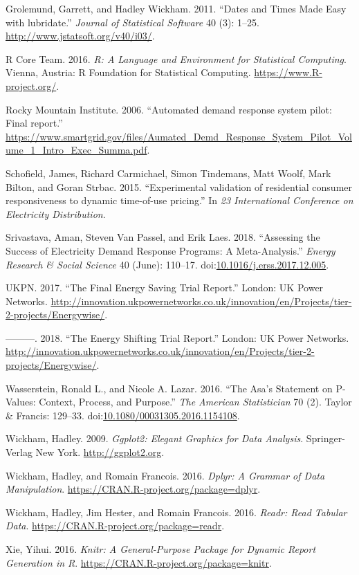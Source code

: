 \documentclass[]{article}
\theoremstyle{definition}
\theoremstyle{definition}
\theoremstyle{definition}
\theoremstyle{remark}
\begin{document}
\hypertarget{ref-lubridate}{}
Grolemund, Garrett, and Hadley Wickham. 2011. ``Dates and Times Made
Easy with lubridate.'' \emph{Journal of Statistical Software} 40 (3):
1--25. \url{http://www.jstatsoft.org/v40/i03/}.

\hypertarget{ref-baseR}{}
R Core Team. 2016. \emph{R: A Language and Environment for Statistical
Computing}. Vienna, Austria: R Foundation for Statistical Computing.
\url{https://www.R-project.org/}.

\hypertarget{ref-RockyMountainInstitute2006Automated}{}
Rocky Mountain Institute. 2006. ``Automated demand response system
pilot: Final report.''
\url{https://www.smartgrid.gov/files/Aumated_Demd_Response_System_Pilot_Volume_1_Intro_Exec_Summa.pdf}.

\hypertarget{ref-Schofield2015Experimental}{}
Schofield, James, Richard Carmichael, Simon Tindemans, Matt Woolf, Mark
Bilton, and Goran Strbac. 2015. ``Experimental validation of residential
consumer responsiveness to dynamic time-of-use pricing.'' In \emph{23
International Conference on Electricity Distribution}.

\hypertarget{ref-Srivastava2018Assessing}{}
Srivastava, Aman, Steven Van Passel, and Erik Laes. 2018. ``Assessing
the Success of Electricity Demand Response Programs: A Meta-Analysis.''
\emph{Energy Research \& Social Science} 40 (June): 110--17.
doi:\href{https://doi.org/10.1016/j.erss.2017.12.005}{10.1016/j.erss.2017.12.005}.

\hypertarget{ref-energyWiseT1}{}
UKPN. 2017. ``The Final Energy Saving Trial Report.'' London: UK Power
Networks.
\url{http://innovation.ukpowernetworks.co.uk/innovation/en/Projects/tier-2-projects/Energywise/}.

\hypertarget{ref-energyWiseT2}{}
---------. 2018. ``The Energy Shifting Trial Report.'' London: UK Power
Networks.
\url{http://innovation.ukpowernetworks.co.uk/innovation/en/Projects/tier-2-projects/Energywise/}.

\hypertarget{ref-wasserstein2016}{}
Wasserstein, Ronald L., and Nicole A. Lazar. 2016. ``The Asa's Statement
on P-Values: Context, Process, and Purpose.'' \emph{The American
Statistician} 70 (2). Taylor \& Francis: 129--33.
doi:\href{https://doi.org/10.1080/00031305.2016.1154108}{10.1080/00031305.2016.1154108}.

\hypertarget{ref-ggplot2}{}
Wickham, Hadley. 2009. \emph{Ggplot2: Elegant Graphics for Data
Analysis}. Springer-Verlag New York. \url{http://ggplot2.org}.

\hypertarget{ref-dplyr}{}
Wickham, Hadley, and Romain Francois. 2016. \emph{Dplyr: A Grammar of
Data Manipulation}. \url{https://CRAN.R-project.org/package=dplyr}.

\hypertarget{ref-readr}{}
Wickham, Hadley, Jim Hester, and Romain Francois. 2016. \emph{Readr:
Read Tabular Data}. \url{https://CRAN.R-project.org/package=readr}.

\hypertarget{ref-knitr}{}
Xie, Yihui. 2016. \emph{Knitr: A General-Purpose Package for Dynamic
Report Generation in R}. \url{https://CRAN.R-project.org/package=knitr}.
\end{document}
